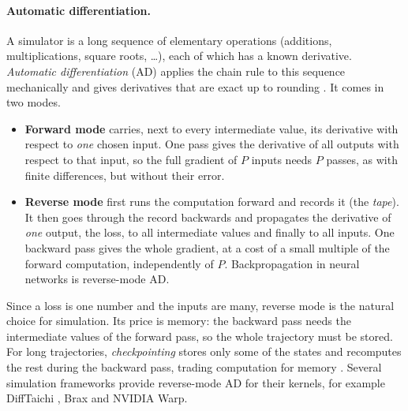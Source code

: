 \paragraph{Automatic differentiation.}
A simulator is a long sequence of elementary operations (additions,
multiplications, square roots, \dots), each of which has a known
derivative. \emph{Automatic differentiation} (AD) applies the chain rule to
this sequence mechanically and gives derivatives that are exact up to
rounding \citep{griewank2008evaluating,baydin2018automatic}. It comes in
two modes.
\begin{itemize}
  \item \textbf{Forward mode} carries, next to every intermediate value,
    its derivative with respect to \emph{one} chosen input. One pass gives
    the derivative of all outputs with respect to that input, so the full
    gradient of $P$ inputs needs $P$ passes, as with finite differences,
    but without their error.
  \item \textbf{Reverse mode} first runs the computation forward and
    records it (the \emph{tape}). It then goes through the record
    backwards and propagates the derivative of \emph{one} output, the loss,
    to all intermediate values and finally to all inputs. One backward
    pass gives the whole gradient, at a cost of a small multiple of the
    forward computation, independently of $P$. Backpropagation in neural
    networks is reverse-mode AD.
\end{itemize}
Since a loss is one number and the inputs are many, reverse mode is the
natural choice for simulation. Its price is memory: the backward pass needs
the intermediate values of the forward pass, so the whole trajectory must
be stored. For long trajectories, \emph{checkpointing} stores only some of
the states and recomputes the rest during the backward pass, trading
computation for memory \citep{griewank2008evaluating}. Several simulation
frameworks provide reverse-mode AD for their kernels, for example
DiffTaichi \citep{hu2020difftaichi}, Brax \citep{freeman2021brax} and
NVIDIA Warp.

